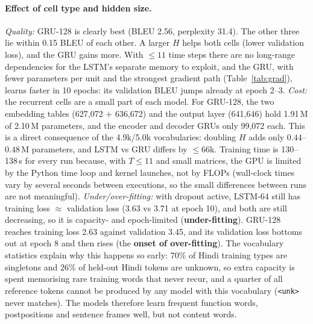 \documentclass[10pt,a4paper]{article}
\newcommand{\code}[1]{\texttt{#1}}
\begin{document}
\paragraph{Effect of cell type and hidden size.}
\emph{Quality:} GRU-128 is clearly best (BLEU 2.56, perplexity 31.4). The other three lie within
0.15 BLEU of each other. A larger $H$ helps both cells (lower validation loss), and the GRU gains more. With
$\le 11$ time steps there are no long-range dependencies for the LSTM's separate memory to exploit, and the
GRU, with fewer parameters per unit and the strongest gradient path (Table~\ref{tab:grad}), learns faster in
10 epochs: its validation BLEU jumps already at epoch 2--3.
\emph{Cost:} the recurrent cells are a small part of each model. For GRU-128, the two embedding tables
(627{,}072 $+$ 636{,}672) and the output layer (641{,}646) hold 1.91\,M of 2.10\,M parameters, and the
encoder and decoder GRUs only 99{,}072 each. This is a direct consequence of the 4.9k/5.0k vocabularies:
doubling $H$ adds only $0.44$--$0.48$\,M parameters, and LSTM vs GRU differs by $\le66$k. Training
time is 130--138\,s for every run because, with $T\le11$ and small matrices, the GPU is limited by the Python
time loop and kernel launches, not by FLOPs (wall-clock times vary by several seconds between executions, so the small differences between runs are not meaningful).
\emph{Under/over-fitting:} with dropout active, LSTM-64 still has training loss $\approx$ validation loss
(3.63 vs 3.71 at epoch 10), and both are still decreasing, so it is capacity- and epoch-limited
(\textbf{under-fitting}). GRU-128 reaches training loss 2.63 against validation 3.45, and its validation loss
bottoms out at epoch 8 and then rises (the \textbf{onset of over-fitting}). The vocabulary statistics explain
why this happens so early: 70\% of Hindi training types are singletons and 26\% of held-out Hindi tokens are
unknown, so extra capacity is spent memorising rare training words that never recur, and a quarter of all
reference tokens cannot be produced by any model with this vocabulary (\code{<unk>} never matches). The
models therefore learn frequent function words, postpositions and sentence frames well, but not content
words.
\end{document}

